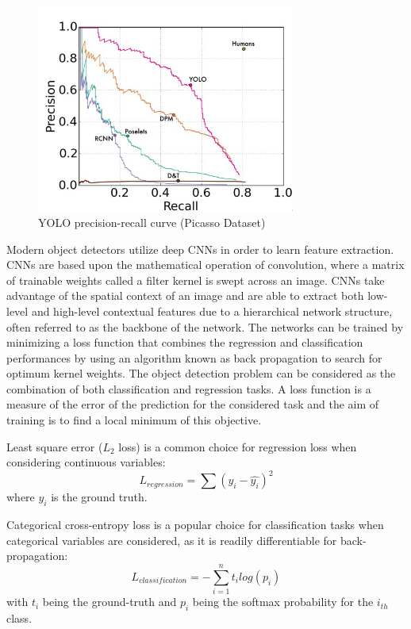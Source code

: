 \documentclass[a4paper,twoside,12pt]{report}
\begin{document}
\begin{figure}[h!]
\begin{center}
\includegraphics[width=8.5cm]{images/yoloplot.jpg}
\caption{YOLO precision-recall curve (Picasso Dataset) \citep{yolo}}
\label{fig:yoloplot}
\end{center}
\end{figure}

Modern object detectors utilize deep CNNs in order to learn feature extraction. CNNs are based upon the mathematical operation of convolution, where a matrix of trainable weights called a filter kernel is swept across an image. CNNs take advantage of the spatial context of an image and are able to extract both low-level and high-level contextual features due to a hierarchical network structure, often referred to as the backbone of the network. The networks can be trained by minimizing a loss function that combines the regression and classification performances by using an algorithm known as back propagation to search for optimum kernel weights. The object detection problem can be considered as the combination of both classification and regression tasks. A loss function is a measure of the error of the prediction for the considered task and the aim of training is to find a local minimum of this objective.

Least square error ($L_2$ loss) is a common choice for regression loss when considering continuous variables:
\begin{equation}
L_{regression} = \sum(y_i-\hat{y_i})^2 
\end{equation} 
where $y_i$ is the ground truth.

Categorical cross-entropy loss is a popular choice for classification tasks when categorical variables are considered, as it is readily differentiable for back-propagation:
\begin{equation}
L_{classification} = -\sum_{i=1}^{n}t_i log(p_i)
\end{equation} 
with $t_i$ being the ground-truth and $p_i$ being the softmax probability for the $i_{th}$ class.
\end{document}
